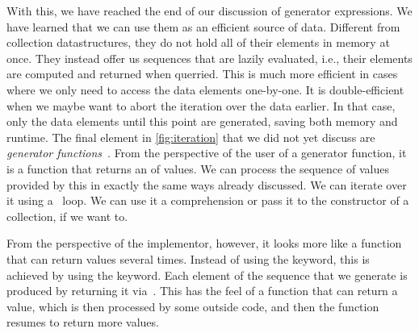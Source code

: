 With this, we have reached the end of our discussion of generator expressions.
We have learned that we can use them as an efficient source of data.
Different from collection datastructures, they do not hold all of their elements in memory at once.
They instead offer us sequences that are lazily evaluated, i.e., their elements are computed and returned when querried.
This is much more efficient in cases where we only need to access the data elements one-by-one.
It is double-efficient when we maybe want to abort the iteration over the data earlier.
In that case, only the data elements until this point are generated, saving both memory and runtime.%
%
\FloatBarrier%
\endhsection%
%
%
\FloatBarrier%
%
%
%
%
%
%
%
%
%
%
The final element in \cref{fig:iteration} that we did not yet discuss are \emph{generator functions}~\cite{PEP255}.
From the perspective of the user of a generator function, it is a function that returns an  of values.
We can process the sequence of values provided by this  in exactly the same ways already discussed.
We can iterate over it using a ~loop.
We can use it a comprehension or pass it to the constructor of a collection, if we want to.

From the perspective of the implementor, however, it looks more like a function that can return values several times.
Instead of using the  keyword, this is achieved by using the  keyword.
Each element of the sequence that we generate is produced by returning it via~.
This has the feel of a function that can return a value, which is then processed by some outside code, and then the function resumes to return more values.

